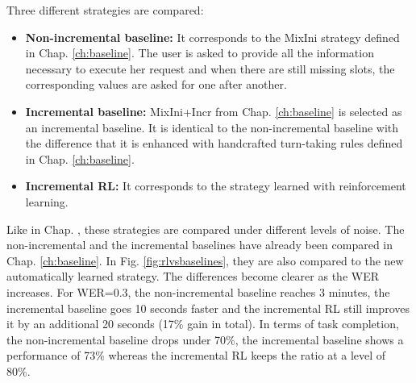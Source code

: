 \begin{figure*}[b]
\begin{minipage}{.47\textwidth}
\end{minipage}
\caption{Mean dialogue duration and task for the non-incremental, the baseline incremental and the RL incremental strategies under different noise conditions.}
\label{fig:rlvsbaselines}
\end{figure*}
    
    	Three different strategies are compared:
        \begin{itemize}
        	\item \textbf{Non-incremental baseline:} It corresponds to the MixIni strategy defined in Chap. \ref{ch:baseline}. The user is asked to provide all the information necessary to execute her request and when there are still missing slots, the corresponding values are asked for one after another.
            \item \textbf{Incremental baseline:} MixIni+Incr from Chap. \ref{ch:baseline} is selected as an incremental baseline. It is identical to the non-incremental baseline with the difference that it is enhanced with handcrafted turn-taking rules defined in Chap. \ref{ch:baseline}.
            \item \textbf{Incremental RL:} It corresponds to the strategy learned with reinforcement learning.
        \end{itemize}
        
        Like in Chap. \cite{ch:baseline}, these strategies are compared under different levels of noise. The non-incremental and the incremental baselines have already been compared in Chap. \ref{ch:baseline}. In Fig. \ref{fig:rlvsbaselines}, they are also compared to the new automatically learned strategy. The differences become clearer as the WER increases. For WER=0.3, the non-incremental baseline reaches 3 minutes, the incremental baseline goes 10 seconds faster and the incremental RL still improves it by an additional 20 seconds (17\% gain in total). In terms of task completion, the non-incremental baseline drops under 70\%, the incremental baseline shows a performance of 73\% whereas the incremental RL keeps the ratio at a level of 80\%.
